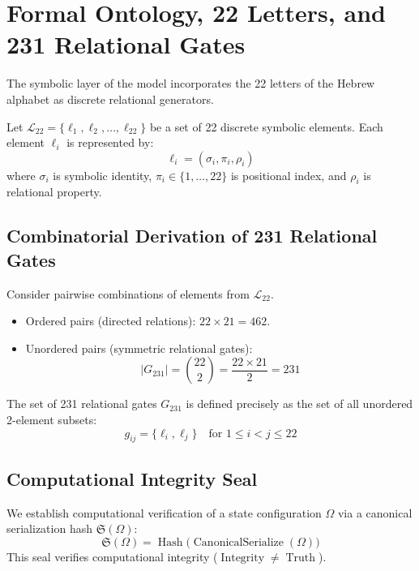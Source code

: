 \section{Formal Ontology, 22 Letters, and 231 Relational Gates}
\label{sec:formal_ontology}

The symbolic layer of the model incorporates the 22 letters of the Hebrew alphabet as discrete relational generators.

\begin{definition}
Let $\mathcal{L}_{22} = \{ \ell_1, \ell_2, \dots, \ell_{22} \}$ be a set of 22 discrete symbolic elements. Each element $\ell_i$ is represented by:
\begin{equation}
\ell_i = (\sigma_i, \pi_i, \rho_i)
\end{equation}
where $\sigma_i$ is symbolic identity, $\pi_i \in \{1, \dots, 22\}$ is positional index, and $\rho_i$ is relational property.
\end{definition}

\subsection{Combinatorial Derivation of 231 Relational Gates}
Consider pairwise combinations of elements from $\mathcal{L}_{22}$.
\begin{itemize}
    \item Ordered pairs (directed relations): $22 \times 21 = 462$.
    \item Unordered pairs (symmetric relational gates):
    \begin{equation}
    |G_{231}| = \binom{22}{2} = \frac{22 \times 21}{2} = 231
    \end{equation}
\end{itemize}

\begin{definition}
The set of 231 relational gates $G_{231}$ is defined precisely as the set of all unordered 2-element subsets:
\begin{equation}
\boxed{g_{ij} = \{ \ell_i, \ell_j \} \quad \text{for } 1 \le i < j \le 22}
\end{equation}
\end{definition}

\subsection{Computational Integrity Seal}
We establish computational verification of a state configuration $\Omega$ via a canonical serialization hash $\mathfrak{S}(\Omega)$:
\begin{equation}
\mathfrak{S}(\Omega) = \operatorname{Hash}\Big(\operatorname{CanonicalSerialize}(\Omega)\Big)
\end{equation}
This seal verifies computational integrity ($\operatorname{Integrity} \neq \operatorname{Truth}$).
